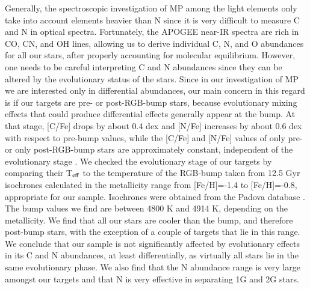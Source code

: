 \documentclass[onecolumn]{aa}
\begin{document}
Generally, the spectroscopic investigation of  MP among the light elements only take into account elements heavier than N since it is very difficult to measure C and N in optical spectra. Fortunately, the APOGEE near-IR spectra are rich in CO, CN, and OH lines, allowing us to derive individual C, N, and O abundances for all our stars, after properly accounting for molecular equilibrium. However, one needs to be careful interpreting C and N abundances since they can be altered by the evolutionary status of the stars. Since in our investigation of MP we are interested only in differential abundances, our main concern in this regard is if our targets are pre- or post-RGB-bump stars, because evolutionary mixing effects that could produce differential effects generally appear at the bump. At that stage, [C/Fe] drops by about 0.4 dex and [N/Fe] increases by about 0.6 dex with respect to pre-bump values, while the [C/Fe] and [N/Fe] values of only pre- or only post-RGB-bump stars are approximately constant, independent of the evolutionary stage \citep{Gratton2000}.
We checked the evolutionary stage of our targets by comparing their
T$_{\rm eff}$ to the 
temperature of the RGB-bump taken from 12.5 Gyr isochrones calculated in the metallicity range from [Fe/H]=-1.4 to [Fe/H]=-0.8, appropriate for our sample. Isochrones were obtained from the Padova database \citep{Bressan2012}. 
The bump values we find are between 4800 K and 4914 K, depending on the metallicity. 
We find that all our stars are cooler than the bump, and therefore post-bump stars, with the exception of a couple of targets that lie in this range. We conclude that our sample is not significantly affected by evolutionary effects in its C and N abundances, at least differentially, as virtually all stars lie in the same evolutionary phase.
We also find that the N abundance range is very large amongst our targets and that N is very effective in separating 1G and 2G stars. 
\end{document}
